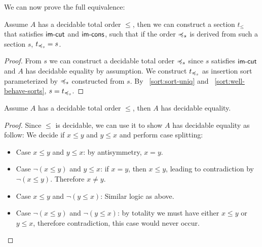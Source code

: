 We can now prove the full equivalence:
\begin{proposition}\label{sort:s2o2s}
    Assume $A$ has a decidable total order $\leq$, then we can construct
    a section $t_\leq$ that satisfies $\operatorname{\mathsf{im-cut}}$ and $\operatorname{\mathsf{im-cons}}$,
    such that if the order $\preccurlyeq_{s}$ is derived from such a section $s$,
    $t_{\preccurlyeq_{s}} = s$.
\end{proposition}
\begin{proof}
    From $s$ we can construct a decidable total order $\preccurlyeq_{s}$ since $s$ satisfies
    $\operatorname{\mathsf{im-cut}}$ and $A$ has decidable equality by assumption.
    We construct $t_{\preccurlyeq_{s}}$ as insertion sort
    parameterized by $\preccurlyeq_{s}$ constructed from $s$.
    By ~\cref{sort:sort-uniq} and ~\cref{sort:well-behave-sorts}, $s = t_{\preccurlyeq_{s}}$.
\end{proof}

\begin{proposition}\label{sort:decord-to-deceq}
    Assume $A$ has a decidable total order $\leq$,
    then $A$ has decidable equality.
\end{proposition}
\begin{proof}
    Since $\leq$ is decidable, we can use it to show $A$ has decidable equality as follow:
    We decide if $x \leq y$ and $y \leq x$ and perform case splitting:
    \begin{itemize}
        \item
              Case $x \leq y$ and $y \leq x$: by antisymmetry, $x = y$.
        \item
              Case $\neg(x \leq y)$ and $y \leq x$: if $x = y$, then $x \leq y$,
              leading to contradiction by $\neg(x \leq y)$. Therefore $x \neq y$.
        \item
              Case $x \leq y$ and $\neg(y \leq x)$: Similar logic as above.
        \item
              Case $\neg(x \leq y)$ and $\neg(y \leq x)$: by totality we must have either
              $x \leq y$ or $y \leq x$, therefore contradiction, this case would never occur.
    \end{itemize}
\end{proof}

